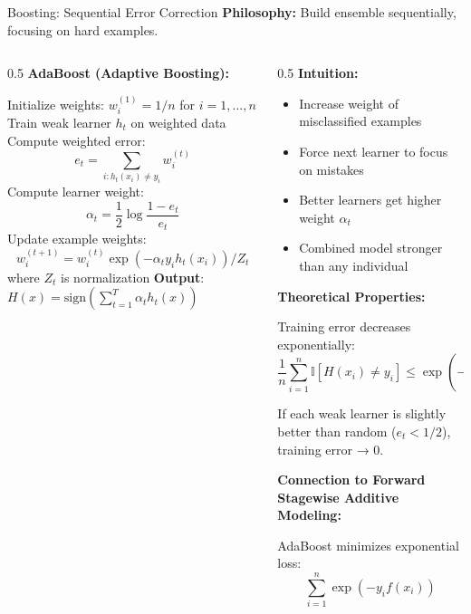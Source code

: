 \begin{frame}{Boosting: Sequential Error Correction}
\textbf{Philosophy:} Build ensemble sequentially, focusing on hard examples.

\begin{columns}
\begin{column}{0.5\textwidth}
\textbf{AdaBoost (Adaptive Boosting):}

\begin{algorithm}[H]
\caption{AdaBoost}
\begin{algorithmic}[1]
\STATE Initialize weights: $w_i^{(1)} = 1/n$ for $i = 1, \ldots, n$
\STATE Train weak learner $h_t$ on weighted data
\STATE Compute weighted error:
\[e_t = \sum_{i: h_t(x_i) \neq y_i} w_i^{(t)}\]
\STATE Compute learner weight:
\[\alpha_t = \frac{1}{2}\log\frac{1 - e_t}{e_t}\]
\STATE Update example weights:
\[w_i^{(t+1)} = w_i^{(t)} \exp(-\alpha_t y_i h_t(x_i)) / Z_t\]
where $Z_t$ is normalization
\ENDFOR
\STATE \textbf{Output}: $H(x) = \text{sign}\left(\sum_{t=1}^T \alpha_t h_t(x)\right)$
\end{algorithmic}
\end{algorithm}
\end{column}
\begin{column}{0.5\textwidth}
\textbf{Intuition:}
\begin{itemize}
\item Increase weight of misclassified examples
\item Force next learner to focus on mistakes
\item Better learners get higher weight $\alpha_t$
\item Combined model stronger than any individual
\end{itemize}

\vspace{0.3cm}
\textbf{Theoretical Properties:}

\begin{theorem}
Training error decreases exponentially:
\[\frac{1}{n}\sum_{i=1}^n \mathbb{I}[H(x_i) \neq y_i] \leq \exp\left(-2\sum_{t=1}^T (\frac{1}{2} - e_t)^2\right)\]
\end{theorem}

If each weak learner is slightly better than random ($e_t < 1/2$), training error → 0.

\vspace{0.3cm}
\textbf{Connection to Forward Stagewise Additive Modeling:}

AdaBoost minimizes exponential loss:
\[\sum_{i=1}^n \exp(-y_i f(x_i))\]
\end{column}
\end{columns}
\end{frame}

